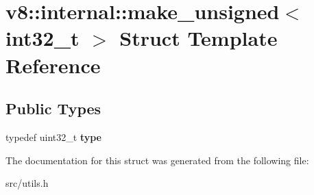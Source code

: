 \hypertarget{structv8_1_1internal_1_1make__unsigned_3_01int32__t_01_4}{}\section{v8\+:\+:internal\+:\+:make\+\_\+unsigned$<$ int32\+\_\+t $>$ Struct Template Reference}
\label{structv8_1_1internal_1_1make__unsigned_3_01int32__t_01_4}
\subsection*{Public Types}
\begin{DoxyCompactItemize}
\item 
\hypertarget{structv8_1_1internal_1_1make__unsigned_3_01int32__t_01_4_a07775c8f5794dd0b41478c2974e01d25}{}typedef uint32\+\_\+t {\bfseries type}\label{structv8_1_1internal_1_1make__unsigned_3_01int32__t_01_4_a07775c8f5794dd0b41478c2974e01d25}

\end{DoxyCompactItemize}


The documentation for this struct was generated from the following file\+:\begin{DoxyCompactItemize}
\item 
src/utils.\+h\end{DoxyCompactItemize}
